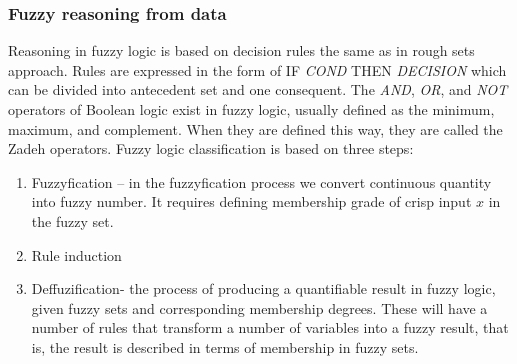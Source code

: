 \subsubsection{Fuzzy reasoning from data}
Reasoning in fuzzy logic is based on decision rules the same as in rough sets approach. 
Rules are expressed in the form of IF \textit{COND} THEN \textit{DECISION} 
which can be divided into antecedent set and one consequent. 
The \textit{AND}, \textit{OR}, and \textit{NOT} operators of 
Boolean logic exist in fuzzy logic, usually defined as the minimum, maximum,
and complement. When they are defined this way, they are called the Zadeh operators.
Fuzzy logic classification is based  on three steps:
\begin{enumerate}
    \item Fuzzyfication – in the fuzzyfication process we 
        convert continuous quantity into fuzzy number. It requires defining
        membership grade of crisp input $x$ in the fuzzy set.
    \item Rule induction
    \item Deffuzification- the process of producing a quantifiable result in fuzzy logic,
        given fuzzy sets and corresponding membership degrees. These will have a number of
        rules that transform a number of variables into a fuzzy result, that is, the result 
        is described in terms of membership in fuzzy sets. 
\end{enumerate}
